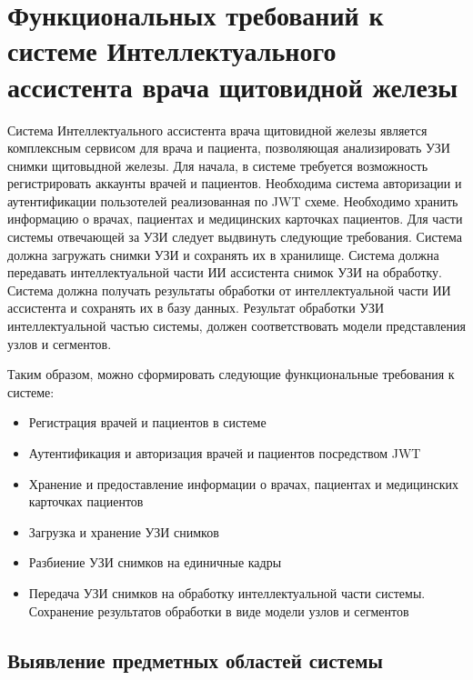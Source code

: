 \section{Функциональных требований к системе Интеллектуального ассистента врача щитовидной железы}

Система Интеллектуального ассистента врача щитовидной железы является комплексным сервисом для врача и пациента, позволяющая анализировать УЗИ снимки щитовыдной железы.
Для начала, в системе требуется возможность регистрировать аккаунты врачей и пациентов. Необходима система авторизации и аутентификации пользотелей реализованная по JWT схеме. 
Необходимо хранить информацию о врачах, пациентах и медицинских карточках пациентов.
Для части системы отвечающей за УЗИ следует выдвинуть следующие требования. Система должна загружать снимки УЗИ и сохранять их в хранилище. 
Система должна передавать интеллектуальной части ИИ ассистента снимок УЗИ на обработку. 
Система должна получать результаты обработки от интеллектуальной части ИИ ассистента и сохранять их в базу данных. Результат обработки УЗИ интеллектуальной частью системы, должен
соответствовать модели представления узлов и сегментов.

Таким образом, можно сформировать следующие функциональные требования к системе:
\begin{itemize}
  \item Регистрация врачей и пациентов в системе
  \item Аутентификация и авторизация врачей и пациентов посредством JWT 
  \item Хранение и предоставление информации о врачах, пациентах и медицинских карточках пациентов
  \item Загрузка и хранение УЗИ снимков
  \item Разбиение УЗИ снимков на единичные кадры
  \item Передача УЗИ снимков на обработку интеллектуальной части системы. Сохранение результатов обработки в виде модели узлов и сегментов
\end{itemize}

\subsection{Выявление предметных областей системы}

